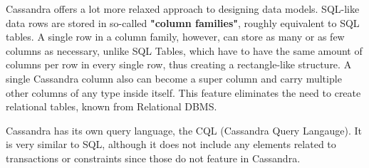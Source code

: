 \par Cassandra offers a lot more relaxed approach to designing data models. SQL-like data rows are stored in so-called \textbf{"column families"}, roughly equivalent to SQL tables. A single row in a column family, however, can store as many or as few columns as necessary, unlike SQL Tables, which have to have the same amount of columns per row in every single row, thus creating a rectangle-like structure. A single Cassandra column also can become a super column and carry multiple other columns of any type inside itself. This feature eliminates the need to create relational tables, known from Relational DBMS\citep{HewittCassandra}.
\par Cassandra has its own query language, the CQL (Cassandra Query Langauge). It is very similar to SQL, although it does not include any elements related to transactions or constraints since those do not feature in Cassandra. \citep{CQL}

